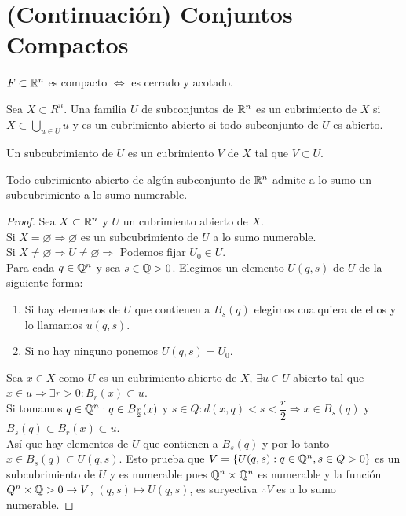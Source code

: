 \section{(Continuación) Conjuntos Compactos}

\begin{corollary}
  $F \subset \mathbb{R}^n$ es compacto $\iff$ es cerrado y acotado.
\end{corollary}

\begin{definition}[Cubrimiento]
  Sea $X \subset R^n$. Una familia $U$ de subconjuntos de $\mathbb{R}^n$ es un cubrimiento de $X$ si $X \subset \bigcup_{u \in U} u$ y es un cubrimiento abierto si todo subconjunto de $U$ es abierto. 
\end{definition}

\begin{definition}[Subcubrimiento]
  Un subcubrimiento de $U$ es un cubrimiento $V$ de $X$ tal que $V \subset U$.
\end{definition}

\begin{theorem}[Lindelöf]
  Todo cubrimiento abierto de algún subconjunto de $\mathbb{R}^n$ admite a lo sumo un subcubrimiento a lo sumo numerable.

  \begin{proof}
    Sea $X \subset \mathbb{R}^n$ y $U$ un cubrimiento abierto de $X$. \\
    Si $X = \varnothing \Rightarrow \varnothing$ es un subcubrimiento de $U$ a lo sumo numerable. \\
    Si $X \neq \varnothing \Rightarrow U \neq \varnothing \Rightarrow$ Podemos fijar $U_0 \in U$. \\
    Para cada $q \in \mathbb{Q}^n$ y sea $s \in \mathbb{Q} > 0$. Elegimos un elemento $U(q, s)$ de $U$ de la siguiente forma: \\
    \begin{enumerate}
      \item Si hay elementos de $U$ que contienen a $B_s(q)$ elegimos cualquiera de ellos y lo llamamos $u(q, s)$.
      \item Si no hay ninguno ponemos $U(q, s) = U_0$.
    \end{enumerate}
    Sea $x \in X$ como $U$ es un cubrimiento abierto de $X$, $\exists u \in U$ abierto tal que $x \in u \Rightarrow \exists r > 0 : B_r(x) \subset u$. \\
    Si tomamos $q \in \mathbb{Q}^n : q \in B_{\frac{r}{2}}(x)$ y $s \in Q : d(x, q) < s < \dfrac{r}{2} \Rightarrow x \in B_s(q)$ y $B_s(q) \subset B_r(x) \subset u$. \\
    Así que hay elementos de $U$ que contienen a $B_s(q)$ y por lo tanto $x \in B_s(q) \subset U(q, s)$. Esto prueba que $V = \{ U(q, s) : q \in \mathbb{Q}^n, s \in Q > 0 \}$ es un subcubrimiento de $U$ y es numerable pues $\mathbb{Q}^n \times \mathbb{Q}^n$ es numerable y la función $Q^n \times \mathbb{Q} > 0 \to V$, $(q, s) \mapsto U(q, s)$, es suryectiva $\therefore V$ es a lo sumo numerable.
  \end{proof}
\end{theorem}

